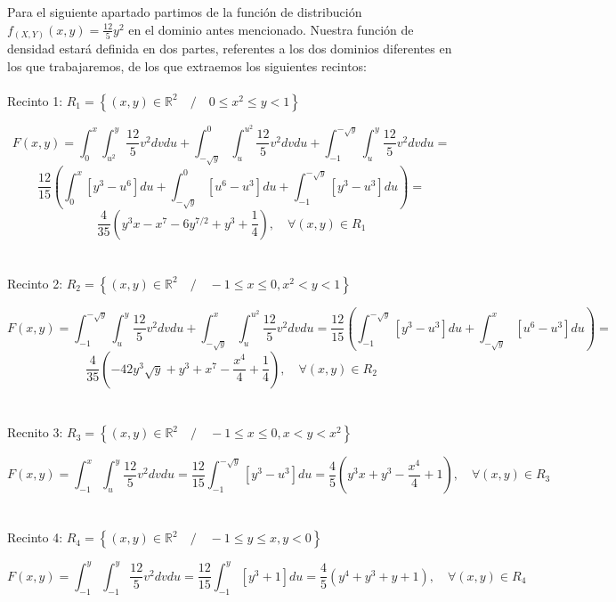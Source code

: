 \documentclass[a4paper, 12pt]{article}
\def\R{\mathds{R}}
\begin{document}
    Para el siguiente apartado partimos de la función de distribución $f_{(X,Y)}(x,y)=\frac{12}{5}y^2$ en el dominio 
    antes mencionado. Nuestra función de densidad estará definida en dos partes, referentes a los dos dominios diferentes
    en los que trabajaremos, de los que extraemos los siguientes recintos:\\ \\

    Recinto 1: $R_1=\left\{(x,y) \in \R^2 \quad / \quad 0\leq x^2 \leq y <1\right\}$

    $$F(x,y)=\int _0^x \int _{u^2}^y \frac{12}{5}v^2 dvdu + \int _{-\sqrt{y}}^0\int _{u}^{u^2} \frac{12}{5}v^2 dvdu + \int_{-1}^{-\sqrt{y}} \int _u^y \frac{12}{5}v^2 dvdu= 
    $$$$\frac{12}{15} \left(\int _0^x \left[y^3-u^6\right] du + \int _{-\sqrt{y}}^0 \left[u^6-u^3\right] du + \int _{-1}^{-\sqrt{y}} \left[y^3-u^3\right] du\right) =
    $$$$\frac{4}{35}\left(y^3x-x^7-6y^{7/2} + y^3+ \frac{1}{4}\right), \quad \forall (x,y) \in R_1$$\\ \\

    Recinto 2: $R_2=\left\{(x,y) \in \R^2 \quad / \quad -1\leq x \leq 0, x^2 <y<1\right\}$

    $$F(x,y)=\int _{-1}^{-\sqrt{y}} \int _{u}^y \frac{12}{5}v^2 dvdu + \int _{-\sqrt{y}}^x\int _{u}^{u^2} \frac{12}{5}v^2 dvdu= 
    \frac{12}{15} \left(\int _{-1}^{-\sqrt{y}} \left[y^3-u^3\right] du + \int _{-\sqrt{y}}^x \left[u^6-u^3\right] du\right) =
    $$$$\frac{4}{35}\left(-42y^3\sqrt{y}+y^3 + x^7-\frac{x^4}{4}+\frac{1}{4}\right), \quad \forall (x,y) \in R_2$$\\ \\

    Recnito 3: $R_3=\left\{(x,y) \in \R^2 \quad / \quad -1\leq x \leq 0, x <y<x^2\right\}$

    $$F(x,y)=\int _{-1}^{x} \int _{u}^y \frac{12}{5}v^2 dvdu = 
    \frac{12}{15} \int _{-1}^{-\sqrt{y}} \left[y^3-u^3\right] du =
    \frac{4}{5}\left(y^3x + y^3 -\frac{x^4}{4}+1\right), \quad \forall (x,y) \in R_3$$\\ \\

    Recinto 4: $R_4=\left\{(x,y) \in \R^2 \quad / \quad -1\leq y \leq x, y<0\right\}$

    $$F(x,y)=\int _{-1}^{y} \int _{-1}^y \frac{12}{5}v^2 dvdu = 
    \frac{12}{15} \int _{-1}^{y} \left[y^3+1\right] du =
    \frac{4}{5}\left(y^4+y^3+y+1\right), \quad \forall (x,y) \in R_4$$\\ \\
\end{document}
